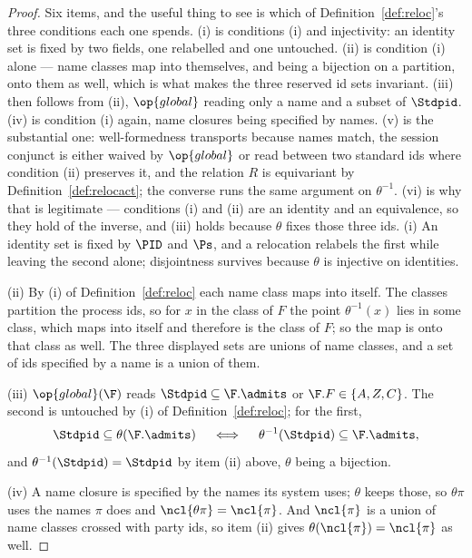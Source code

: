 \documentclass[10pt,oneside,openany]{book}
\theoremstyle{accentdef}
\theoremstyle{accentplain}
\begin{document}
\begin{proof}
Six items, and the useful thing to see is which of Definition~\ref{def:reloc}'s three conditions
each one spends. (i) is conditions (i) and injectivity: an identity set is fixed by two fields, one
relabelled and one untouched. (ii) is condition (i) alone --- name classes map into themselves, and
being a bijection on a partition, onto them as well, which is what makes the three reserved id sets
invariant. (iii) then follows from (ii), $\op{global}$ reading only a name and a subset of $\Stdpid$.
(iv) is condition (i) again, name closures being specified by names. (v) is the substantial one:
well-formedness transports because names match, the session conjunct is either waived by
$\op{global}$ or read between two standard ids where condition (ii) preserves it, and the relation
$R$ is equivariant by Definition~\ref{def:relocact}; the converse runs the same argument on
$\theta^{-1}$. (vi) is why that is legitimate --- conditions (i) and (ii) are an identity and an
equivalence, so they hold of the inverse, and (iii) holds because $\theta$ fixes those three ids.
(i) An identity set is fixed by $\PID$ and $\Ps$, and a relocation relabels the first while leaving
the second alone; disjointness survives because $\theta$ is injective on identities.

(ii) By (i) of Definition~\ref{def:reloc} each name class maps into itself. The classes partition the
process ids, so for $x$ in the class of $F$ the point $\theta^{-1}(x)$ lies in some class, which maps
into itself and therefore is the class of $F$; so the map is onto that class as well. The three
displayed sets are unions of name classes, and a set of ids specified by a name is a union of them.

(iii) $\op{global}(\F)$ reads $\Stdpid \subseteq \F.\admits$ or $\F.F \in \{A,Z,C\}$. The second is
untouched by (i) of Definition~\ref{def:reloc}; for the first,
\[
  \Stdpid \subseteq \theta(\F.\admits)
  \quad\iff\quad
  \theta^{-1}(\Stdpid) \subseteq \F.\admits ,
\]
and $\theta^{-1}(\Stdpid) = \Stdpid$ by item (ii) above, $\theta$ being a bijection.

(iv) A name closure is specified by the names its system uses; $\theta$ keeps those, so $\theta\pi$
uses the names $\pi$ does and $\ncl{\theta\pi} = \ncl{\pi}$. And $\ncl{\pi}$ is a union of name
classes crossed with party ids, so item (ii) gives $\theta(\ncl{\pi}) = \ncl{\pi}$ as well.


\end{proof}
\end{document}
